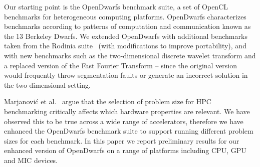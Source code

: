 \documentclass[../document.tex]{subfiles}
\begin{document}
Our starting point is the OpenDwarfs benchmark suite, a set of OpenCL benchmarks for heterogeneous computing platforms.\cite{krommydas2016opendwarfs}
OpenDwarfs characterizes benchmarks according to patterns of computation and communication known as the 13 Berkeley Dwarfs.\cite{asanovic2006landscape}
We extended OpenDwarfs with additional benchmarks taken from the Rodinia suite~\cite{che2009rodinia} (with modifications to improve portability), and with new benchmarks such as the two-dimensional discrete wavelet transform and a replaced version of the Fast Fourier Transform -- since the original version would frequently throw segmentation faults or generate an incorrect solution in the two dimensional setting.

Marjanovi\'{c} et al.~\cite{marjanovic2016hpc} argue that the selection of problem size for HPC benchmarking critically affects which hardware properties are relevant.
We have observed this to be true across a wide range of accelerators, therefore we have enhanced the OpenDwarfs benchmark suite to support running different problem sizes for each benchmark.
In this paper we report preliminary results for our enhanced version of OpenDwarfs on a range of platforms including CPU, GPU and MIC devices.

\end{document}
